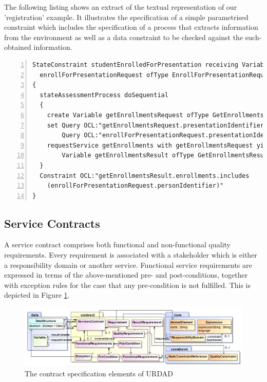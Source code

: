 The following listing shows an extract of the textual representation of our 'registration' example. It illustrates the specification of a simple parametrised constraint which includes the specification of a process that extracts information from the environment as well as a data constraint to be checked against the such-obtained information.
\lstset{language=urdad,caption=Specifying a state constraint in the textual URDAD DSL syntax.,label=constraintTextSyntax}
\small \begin{lstlisting}[numbers=left,escapechar=|]
StateConstraint studentEnrolledForPresentation receiving Variable 
  enrollForPresentationRequest ofType EnrollForPresentationRequest
{
  stateAssessmentProcess doSequential
  {
    create Variable getEnrollmentsRequest ofType GetEnrollmentsRequest
    set Query OCL:"getEnrollmentsRequest.presentationIdentifier" equalTo
        Query OCL:"enrollForPresentationRequest.presentationIdentifier"
    requestService getEnrollments with getEnrollmentsRequest yielding
        Variable getEnrollmentsResult ofType GetEnrollmentsResult
  }
  Constraint OCL:"getEnrollmentsResult.enrollments.includes
    (enrollForPresentationRequest.personIdentifier)"
}
\end{lstlisting}\normalsize


\subsection{Service Contracts}

A service contract comprises both functional and non-functional quality requirements. Every requirement is associated with a stakeholder which is either a responsibility domain or another service. Functional service requirements are expressed in terms of the above-mentioned pre- and post-conditions, together with exception rules for the case that any pre-condition is not fulfilled. This is depicted in Figure \ref{fig:contractModule}.
\begin{figure}[Htbp]
  \centering
  \includegraphics{contract}
  \caption{The contract specification elements of URDAD}
  \label{fig:contractModule}
\end{figure}

